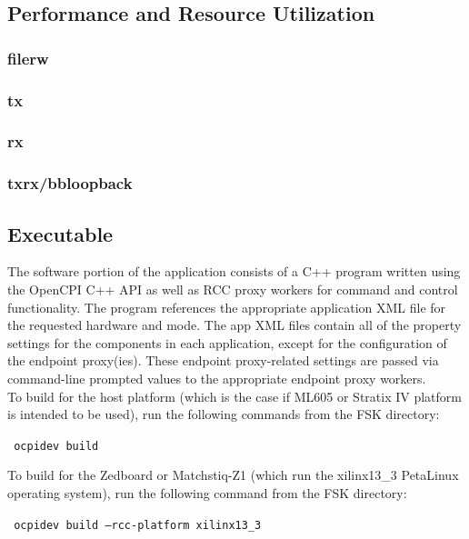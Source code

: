 	\newpage
\begin{landscape}
\subsection{Performance and Resource Utilization}
\subsubsection{filerw}

\subsubsection{tx}

\subsubsection{rx}

\subsubsection{txrx/bbloopback}

\end{landscape}
\subsection{Executable}
The software portion of the application consists of a C++ program written using the OpenCPI C++ API as well as RCC proxy workers for command and control functionality. The program references the appropriate application XML file for the requested hardware and mode. The app XML files contain all of the property settings for the components in each application, except for the configuration of the endpoint proxy(ies). These endpoint proxy-related settings are passed via command-line prompted values to the appropriate endpoint proxy workers.\\
To build for the host platform (which is the case if ML605 or Stratix IV platform is intended to be used), run the following commands from the FSK directory:\par\medskip
\texttt{ ocpidev build}\par\medskip
\noindent To build for the Zedboard or Matchstiq-Z1 (which run the xilinx13\_3 PetaLinux operating system), run the following command from the FSK directory:\par\medskip
\texttt{ ocpidev build --rcc-platform xilinx13\_3 }\par\medskip

